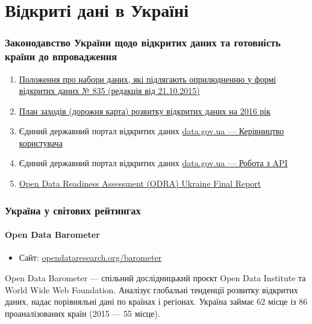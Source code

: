 \chapter{Відкриті дані в Україні}

\subsection{Законодавство України щодо відкритих даних та готовність країни до впровадження}

\begin{enumerate}
    \item \href{http://zakon2.rada.gov.ua/laws/show/319-19}{Положення про набори даних, які підлягають оприлюдненню у формі відкритих даних № 835 (редакція від 21.10.2015)}
    \item \href{https://drive.google.com/file/d/0B1kGsKt9XV_QaFZVaTZiT19aRTA/view}{План заходів (дорожня карта) розвитку відкритих даних на 2016 рік}
    \item Єдиний державний портал відкритих даних \href{https://data.gov.ua/}{data.gov.ua — Керівництво користувача}
    \item Єдиний державний портал відкритих даних \href{https://data.gov.ua/}{data.gov.ua — Робота з API}
    \item \href{https://docs.google.com/document/d/1g5VUhUzjgTVvcp7zvlWbCUsmoJNaQ6w4T3vacYSu34U/edit}{Open Data Readiness Assessment (ODRA) Ukraine Final Report}
\end{enumerate}

\subsection{Україна у світових рейтингах}

\subsubsection{Open Data Barometer}

\begin{itemize}
    \item Сайт: \href{http://www.opendataresearch.org/barometer}{opendataresearch.org/barometer}
\end{itemize}

Open Data Barometer — спільний дослідницький проєкт Open Data Institute та World Wide Web Foundation. Аналізує глобальні тенденції розвитку відкритих даних, надає порівняльні дані по країнах і регіонах. Україна займає 62 місце із 86 проаналізованих країн (2015 — 55 місце).

